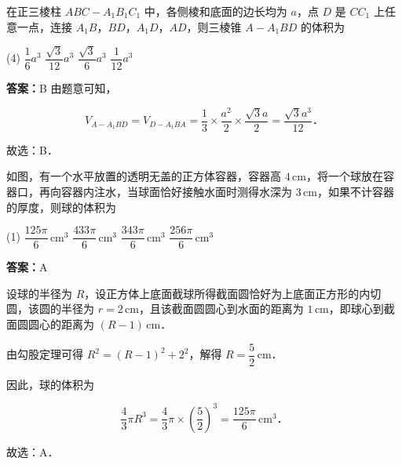 \vspace{2em}

\begin{example}[\bkstar{3}{5}]
在正三棱柱 $ABC-A_1B_1C_1$ 中，各侧棱和底面的边长均为 $a$，点 $D$ 是 $CC_1$ 上任意一点，连接 $A_1B$，$BD$，$A_1D$，$AD$，则三棱锥 $A-A_1BD$ 的体积为
\begin{tasks}(4)
    \task $\dfrac{1}{6}a^3$
    \task $\dfrac{\sqrt{3}}{12}a^3$
    \task $\dfrac{\sqrt{3}}{6}a^3$
    \task $\dfrac{1}{12}a^3$
\end{tasks}
\end{example}
\begin{solution}
\textbf{答案：}B
由题意可知，

$$
V_{A-A_1BD}=V_{D-A_1BA}=\dfrac{1}{3}\times\dfrac{a^2}{2}\times\dfrac{\sqrt{3}a}{2}=\dfrac{\sqrt{3}a^3}{12}．
$$

故选：B．
\end{solution}

\vspace{2em}


\begin{example}[\bkstar{3}{5}]
如图，有一个水平放置的透明无盖的正方体容器，容器高 $4\,\mathrm{cm}$，将一个球放在容器口，再向容器内注水，当球面恰好接触水面时测得水深为 $3\,\mathrm{cm}$，如果不计容器的厚度，则球的体积为
\begin{tasks}(1)
    \task $\dfrac{125\pi}{6}\,\mathrm{cm}^3$
    \task $\dfrac{433\pi}{6}\,\mathrm{cm}^3$
    \task $\dfrac{343\pi}{6}\,\mathrm{cm}^3$
    \task $\dfrac{256\pi}{6}\,\mathrm{cm}^3$
\end{tasks}
\end{example}
\begin{solution}
\textbf{答案：}A

设球的半径为 $R$，设正方体上底面截球所得截面圆恰好为上底面正方形的内切圆，该圆的半径为 $r=2\,\mathrm{cm}$，且该截面圆圆心到水面的距离为 $1\,\mathrm{cm}$，即球心到截面圆圆心的距离为 $(R-1)\,\mathrm{cm}$．

由勾股定理可得 $R^2=(R-1)^2+2^2$，解得 $R=\dfrac{5}{2}\,\mathrm{cm}$．

因此，球的体积为

$$
\dfrac{4}{3}\pi R^3=\dfrac{4}{3}\pi\times\left(\dfrac{5}{2}\right)^3=\dfrac{125\pi}{6}\,\mathrm{cm}^3．
$$

故选：A．
\end{solution}

